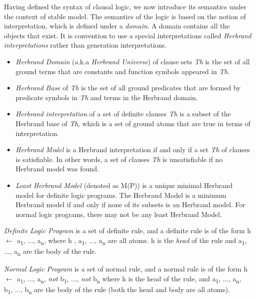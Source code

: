 \documentclass[12pt,twoside]{report}
\newtheorem{examp}{example}[section]
\begin{document}
Having defined the syntax of clausal logic, we now introduce its semantics under the context of stable model. The semantics of the logic is based on the notion of interpretation, which is defined under a \textit{domain}. A domain contains all the objects that exist. It is convention to use a special interpretations called \textit{Herbrand interpretations} rather than generation interpretations.
\begin{itemize}
\item \textit{Herbrand Domain} (a.k.a \textit{Herbrand Universe}) of clause sets \textit{Th} is the set of all ground terms that are constants and function symbols appeared in \textit{Th}.
\item \textit{Herbrand Base} of \textit{Th} is the set of all ground predicates that are formed by predicate symbols in \textit{Th} and terms in the Herbrand domain.
\item \textit{Herbrand interpretation} of a set of definite clauses \textit{Th} is a subset of the Herbrand base of \textit{Th}, which is a set of ground atoms that are true in terms of interpretation.
\item \textit{Herbrand Model} is a Herbrand interpretation if and only if a set \textit{Th} of clauses is satisfiable. In other words, a set of clauses \textit{Th} is unsatisfiable if no Herbrand model was found. 
\item \textit{Least Herbrand Model} (denoted as M(P)) is a unique minimal Herbrand model for definite logic programs.  The Herbrand Model is a minimum Herbrand model if and only if none of its subsets is an Herbrand model. For normal logic programs, there may not be any least Herbrand Model.

\end{itemize}

\textit{Definite Logic Program} is a set of definite rule, and  a definite rule is of the form h $\leftarrow$ a\textsubscript{1}, ..., a\textsubscript{n}, where h , a\textsubscript{1}, ..., a\textsubscript{n} are all atoms. h is the \textit{head} of the rule and a\textsubscript{1}, ..., a\textsubscript{n} are the body of the rule.

\textit{Normal Logic Program} is a set of normal rule, and a normal rule is of the form h $\leftarrow$ a\textsubscript{1}, ..., a\textsubscript{n}, \textit{not} b\textsubscript{1}, ..., \textit{not}  b\textsubscript{n} where h is the head of the rule,
 and a\textsubscript{1}, ..., a\textsubscript{n}, b\textsubscript{1}, ..., b\textsubscript{n} are the body of the rule (both the head and body are all atoms).
\end{document}

